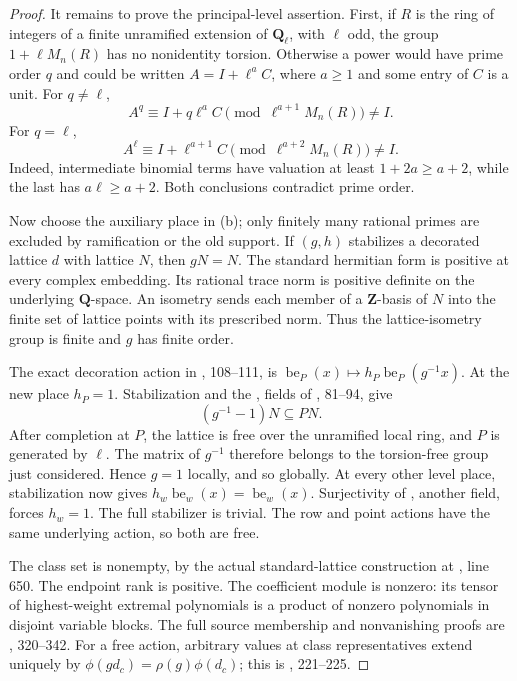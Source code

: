 \documentclass[11pt,a4paper]{article}
\theoremstyle{definition}\newtheorem{remark}[theorem]{Remark}
\begin{document}
\begin{proof}
It remains to prove the principal-level assertion.
First, if $R$ is the ring of integers of a finite unramified extension
of $\mathbf Q_\ell$, with $\ell$ odd, the group
$1+\ell M_n(R)$ has no nonidentity torsion.
Otherwise a power would have prime order $q$ and could be written
$A=I+\ell^aC$, where $a\ge1$ and some entry of $C$ is a unit.
For $q\ne\ell$,
\[
 A^q\equiv I+q\ell^aC\pmod{\ell^{a+1}M_n(R)}\ne I.
\]
For $q=\ell$,
\[
 A^\ell\equiv I+\ell^{a+1}C
                  \pmod{\ell^{a+2}M_n(R)}\ne I.
\]
Indeed, intermediate binomial terms have valuation at least
$1+2a\ge a+2$, while the last has $a\ell\ge a+2$.
Both conclusions contradict prime order.

Now choose the auxiliary place in (b); only finitely many rational primes
are excluded by ramification or the old support.
If $(g,h)$ stabilizes a decorated lattice $d$ with lattice $N$, then
$gN=N$.
The standard hermitian form is positive at every complex embedding.
Its rational trace norm is positive definite on the underlying
$\mathbf Q$-space.
An isometry sends each member of a $\mathbf Z$-basis of $N$ into the
finite set of lattice points with its prescribed norm.
Thus the lattice-isometry group is finite and $g$ has finite order.

The exact decoration action in , 108--111,
is $\operatorname{be}_P(x)\mapsto
h_P\operatorname{be}_P(g^{-1}x)$.
At the new place $h_P=1$.
Stabilization and the ,  fields of
, 81--94, give
\[
 (g^{-1}-1)N\subseteq PN.
\]
After completion at $P$, the lattice is free over the unramified local
ring, and $P$ is generated by $\ell$.
The matrix of $g^{-1}$ therefore belongs to the torsion-free group just
considered. Hence $g=1$ locally, and so globally.
At every other level place, stabilization now gives
$h_w\operatorname{be}_w(x)=\operatorname{be}_w(x)$.
Surjectivity of , another  field, forces
$h_w=1$. The full stabilizer is trivial.
The row and point actions have the same underlying action, so both
are free.

The class set is nonempty, by the actual standard-lattice construction
 at , line 650.
The endpoint rank is positive.
The coefficient module is nonzero: its tensor of highest-weight
extremal polynomials is a product of nonzero polynomials in disjoint
variable blocks. The full source membership and nonvanishing proofs
are , 320--342.
For a free action, arbitrary values at class representatives extend
uniquely by $\phi(gd_c)=\rho(g)\phi(d_c)$;
this is , 221--225.


\end{proof}
\end{document}
